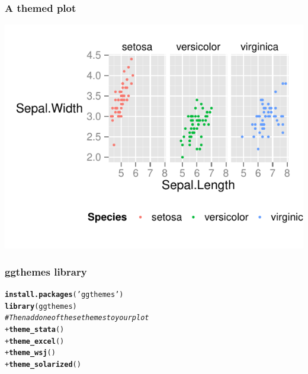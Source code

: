 \documentclass{beamer}\usepackage[]{graphicx}\usepackage[]{color}
\makeatletter
\newcommand{\hlstr}[1]{\textcolor[rgb]{0.192,0.494,0.8}{#1}}%
\newcommand{\hlcom}[1]{\textcolor[rgb]{0.678,0.584,0.686}{\textit{#1}}}%
\newcommand{\hlopt}[1]{\textcolor[rgb]{0,0,0}{#1}}%
\newcommand{\hlstd}[1]{\textcolor[rgb]{0.345,0.345,0.345}{#1}}%
\newcommand{\hlkwd}[1]{\textcolor[rgb]{0.737,0.353,0.396}{\textbf{#1}}}%
\newenvironment{kframe}{%
 \def\at@end@of@kframe{}%
 \ifinner\ifhmode%
  \def\at@end@of@kframe{\end{minipage}}%
  \begin{minipage}{\columnwidth}%
 \fi\fi%
 \def\FrameCommand##1{\hskip\@totalleftmargin \hskip-\fboxsep
 \colorbox{shadecolor}{##1}\hskip-\fboxsep
     \hskip-\linewidth \hskip-\@totalleftmargin \hskip\columnwidth}%
 \MakeFramed {\advance\hsize-\width
   \@totalleftmargin\z@ \linewidth\hsize
   \@setminipage}}%
 {\par\unskip\endMakeFramed%
 \at@end@of@kframe}
\newenvironment{knitrout}{}{} %
\makeatother
\begin{document}

\begin{frame}[fragile]
\frametitle{A themed plot}
\begin{knitrout}\footnotesize
{}\color{fgcolor}
\includegraphics[width=.75\linewidth]{figure/facet_wrap_theme_execc} 

\end{knitrout}
\end{frame}


\begin{frame}[fragile]
\frametitle{ggthemes library}
\begin{knitrout}\footnotesize
{}\color{fgcolor}\begin{kframe}
\begin{alltt}
\hlkwd{install.packages}\hlstd{(}\hlstr{'ggthemes'}\hlstd{)}
\hlkwd{library}\hlstd{(ggthemes)}
\hlcom{# Then add one of these themes to your plot}
 \hlopt{+} \hlkwd{theme_stata}\hlstd{()}
 \hlopt{+} \hlkwd{theme_excel}\hlstd{()}
 \hlopt{+} \hlkwd{theme_wsj}\hlstd{()}
 \hlopt{+} \hlkwd{theme_solarized}\hlstd{()}
\end{alltt}
\end{kframe}
\end{knitrout}
\end{frame}

\end{document}
